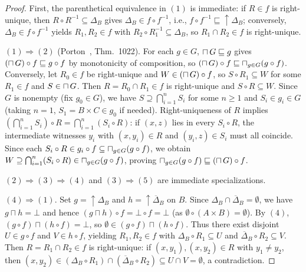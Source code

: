 \documentclass[11pt]{article}
\theoremstyle{remark}
\newcommand{\bigsqcap}{\mathop{\mathchoice{\vcenter{\hbox{\Large$\sqcap$}}}{\sqcap}{\sqcap}{\sqcap}}}
\begin{document}
\begin{proof}
First, the parenthetical equivalence in $(1)$ is immediate: if $R \in f$ is right-unique, then $R \circ R^{-1} \subseteq \Delta_B$ gives $\Delta_B \in f \circ f^{-1}$, i.e., $f \circ f^{-1} \sqsubseteq \uparrow\Delta_B$; conversely, $\Delta_B \in f \circ f^{-1}$ yields $R_1, R_2 \in f$ with $R_2 \circ R_1^{-1} \subseteq \Delta_B$, so $R_1 \cap R_2 \in f$ is right-unique.

\medskip\noindent
$(1) \Rightarrow (2)$ (Porton~\cite{porton}, Thm.~1022).
For each $g \in G$, $\bigsqcap G \sqsubseteq g$ gives $(\bigsqcap G) \circ f \sqsubseteq g \circ f$ by monotonicity of composition, so $(\bigsqcap G) \circ f \sqsubseteq \bigsqcap_{g \in G} (g \circ f)$.
Conversely, let $R_0 \in f$ be right-unique and $W \in (\bigsqcap G) \circ f$, so $S \circ R_1 \subseteq W$ for some $R_1 \in f$ and $S \in \bigsqcap G$.
Then $R = R_0 \cap R_1 \in f$ is right-unique and $S \circ R \subseteq W$.
Since $G$ is nonempty (fix $g_0 \in G$), we have $S \supseteq \bigcap_{i=1}^n S_i$ for some $n \ge 1$ and $S_i \in g_i \in G$ (taking $n=1$, $S_1 = B \times C \in g_0$ if needed).
Right-uniqueness of $R$ implies $(\bigcap_{i=1}^n S_i) \circ R = \bigcap_{i=1}^n (S_i \circ R)$: if $(x,z)$ lies in every $S_i \circ R$, the intermediate witnesses $y_i$ with $(x,y_i) \in R$ and $(y_i,z) \in S_i$ must all coincide.
Since each $S_i \circ R \in g_i \circ f \subseteq \bigsqcap_{g \in G} (g \circ f)$, we obtain $W \supseteq \bigcap_{i=1}^n (S_i \circ R) \in \bigsqcap_{g \in G} (g \circ f)$, proving $\bigsqcap_{g \in G} (g \circ f) \sqsubseteq (\bigsqcap G) \circ f$.

\medskip\noindent
$(2) \Rightarrow (3) \Rightarrow (4)$ and $(3) \Rightarrow (5)$ are immediate specializations.

\medskip\noindent
$(4) \Rightarrow (1)$.
Set $g = \uparrow\Delta_B$ and $h = \uparrow\overline{\Delta}_B$ on $B$.
Since $\Delta_B \cap \overline{\Delta}_B = \emptyset$, we have $g \sqcap h = \bot$ and hence $(g \sqcap h) \circ f = \bot \circ f = \bot$ (as $\emptyset \circ (A \times B) = \emptyset$).
By $(4)$, $(g \circ f) \sqcap (h \circ f) = \bot$, so $\emptyset \in (g \circ f) \sqcap (h \circ f)$.
Thus there exist disjoint $U \in g \circ f$ and $V \in h \circ f$, yielding $R_1, R_2 \in f$ with $\Delta_B \circ R_1 \subseteq U$ and $\overline{\Delta}_B \circ R_2 \subseteq V$.
Then $R = R_1 \cap R_2 \in f$ is right-unique: if $(x, y_1), (x, y_2) \in R$ with $y_1 \neq y_2$, then $(x, y_2) \in (\Delta_B \circ R_1) \cap (\overline{\Delta}_B \circ R_2) \subseteq U \cap V = \emptyset$, a contradiction.


\end{proof}
\end{document}
